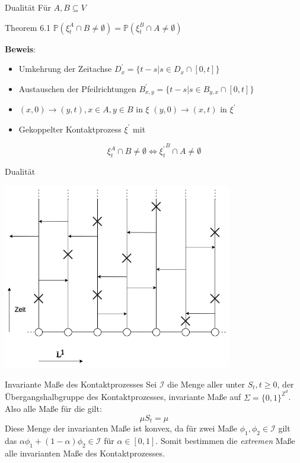 \documentclass[11pt]{beamer}
\begin{document}
\begin{frame}{Dualität}
    Für $A, B \subseteq V$
    \begin{block}{Theorem 6.1}
        $\mathbb{P}(\xi_t^A \cap B \not= \emptyset) = \mathbb{P}(\xi_t^B \cap A \not = \emptyset)$
    \end{block}
    \textbf{Beweis}:
    \\
    \begin{itemize}
        \item<2-> Umkehrung der Zeitachse $D_x^\prime = \{t - s | s \in D_x \cap [0, t] \}$
        \item<3-> Austauschen der Pfeilrichtungen $B_{x, y}^\prime = \{ t - s | s \in B_{y, x} \cap [0, t]\}$
        \item<4-> $(x, 0) \to (y, t), x \in A, y \in B$ in $\xi$ \iff $(y, 0) \to (x, t)$ in $\xi^\prime$
        \item<5-> Gekoppelter Kontaktprozess $\xi^\prime$ mit 
    \end{itemize}
    \begin{equation*}
        \xi_t^A \cap B \not= \emptyset \iff {\xi_t^\prime}^B \cap A \not = \emptyset
    \end{equation*}
\end{frame}

\begin{frame}{Dualität}
    \begin{center}
        \includegraphics[width=0.75\textwidth]{images/contact process arrows.png}
    \end{center}
\end{frame}

\begin{frame}{Invariante Maße des Kontaktprozesses}
    Sei $\mathcal{I}$ die Menge aller unter $S_t, t \geq 0$, der Übergangshalbgruppe  
    des Kontaktprozesses, invariante Maße auf $\Sigma = \{ 0, 1 \}^{\mathbb{Z}^d}$.
    Also alle Maße für die gilt:
    \begin{equation*}
        \mu S_t = \mu
    \end{equation*}
    Diese Menge der invarianten Maße ist konvex, da für zwei Maße $\phi_1, \phi_2 \in \mathcal{I}$
    gilt das $\alpha \phi_1 + ( 1 - \alpha) \phi_2 \in \mathcal{I}$ für $\alpha \in [0, 1]$.
    Somit bestimmen die \textit{extremen} Maße alle invarianten Maße des Kontaktprozesses.
\end{frame}
\end{document}
